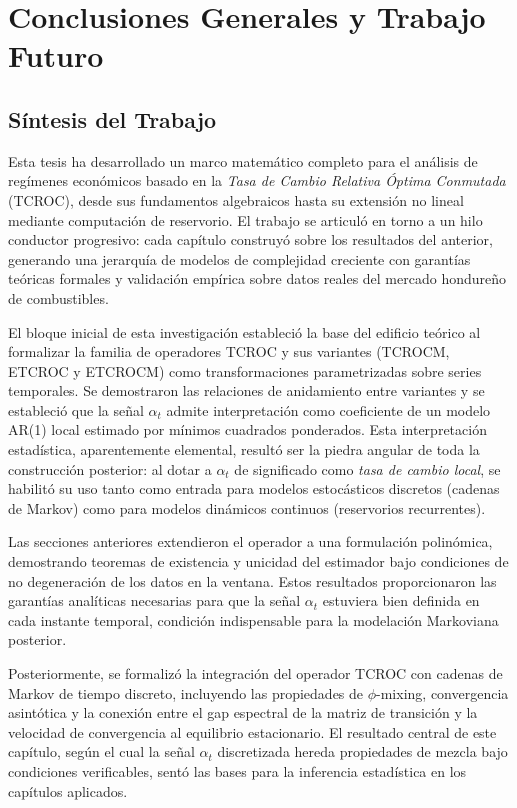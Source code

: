 \chapter{Conclusiones Generales y Trabajo Futuro}
\label{cap:conclusiones}

\section{Síntesis del Trabajo}
\label{sec:sintesis}

Esta tesis ha desarrollado un marco matemático completo para el
análisis de regímenes económicos basado en la \emph{Tasa de Cambio
Relativa Óptima Conmutada} (TCROC), desde sus fundamentos
algebraicos hasta su extensión no lineal mediante computación de
reservorio.  El trabajo se articuló en torno a un hilo conductor
progresivo: cada capítulo construyó sobre los resultados del
anterior, generando una jerarquía de modelos de complejidad
creciente con garantías teóricas formales y validación empírica
sobre datos reales del mercado hondureño de combustibles.

El bloque inicial de esta investigación estableció la base
del edificio teórico al formalizar la familia de operadores TCROC y
sus variantes (TCROCM, ETCROC y ETCROCM) como transformaciones
parametrizadas sobre series temporales.  Se demostraron las
relaciones de anidamiento entre variantes y se estableció que la
señal $\alpha_t$ admite interpretación como coeficiente de un modelo
AR(1) local estimado por mínimos cuadrados ponderados.  Esta
interpretación estadística, aparentemente elemental, resultó ser la
piedra angular de toda la construcción posterior: al dotar a
$\alpha_t$ de significado como \emph{tasa de cambio local}, se
habilitó su uso tanto como entrada para modelos estocásticos
discretos (cadenas de Markov) como para modelos dinámicos continuos
(reservorios recurrentes).

Las secciones anteriores extendieron el operador a una
formulación polinómica, demostrando teoremas de existencia y
unicidad del estimador bajo condiciones de no degeneración de los
datos en la ventana.  Estos resultados proporcionaron las garantías
analíticas necesarias para que la señal $\alpha_t$ estuviera bien
definida en cada instante temporal, condición indispensable para la
modelación Markoviana posterior.

Posteriormente, se formalizó la integración del
operador TCROC con cadenas de Markov de tiempo discreto, incluyendo
las propiedades de $\phi$-mixing, convergencia asintótica y la
conexión entre el gap espectral de la matriz de transición y la
velocidad de convergencia al equilibrio estacionario.  El resultado
central de este capítulo, según el cual la señal $\alpha_t$ discretizada
hereda propiedades de mezcla bajo condiciones verificables, sentó
las bases para la inferencia estadística en los capítulos aplicados.

